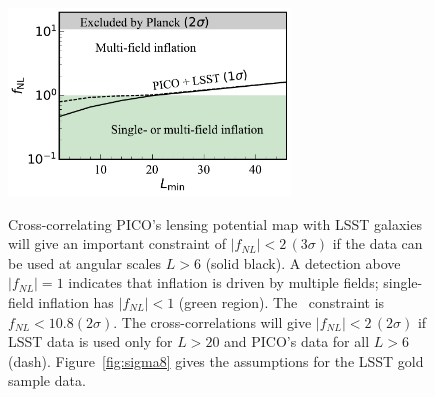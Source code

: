 \documentclass[PICOReport.tex]{subfiles}
\begin{document}
\begin{figure}[h]
\hspace{-0.in}
\parbox{3.0in}{{
\includegraphics[width=2.95in]{images/PICO_fnl_lmin_PICOv4.1b_deproj0_SENS0_LSST10yrGoldWithDropouts.pdf} } }   %
\hspace{0.in}
\parbox{3.4in}{
\caption{\captiontext
Cross-correlating PICO's lensing potential map with LSST galaxies will give an important constraint of $|f_{NL}|<2\, (3\sigma)$  if the data can be used at  angular scales $L > 6$ (solid black). A detection above $|f_{NL}| =1$ indicates that inflation is driven by multiple fields; single-field inflation has $|f_{NL}|<1$ (green region). The \planck\ constraint is $f_{NL} < 10.8 (2\sigma)$. The cross-correlations will give $|f_{NL}|<2\, (2\sigma)$ if LSST data is used only for $L>20$ and PICO's data for all $L>6$ (dash). Figure~\ref{fig:sigma8} gives the assumptions for the LSST gold sample data. 
\label{fig:fnlconstraint}
} }
\vspace{-0.1in}
\end{figure}

\end{document}
